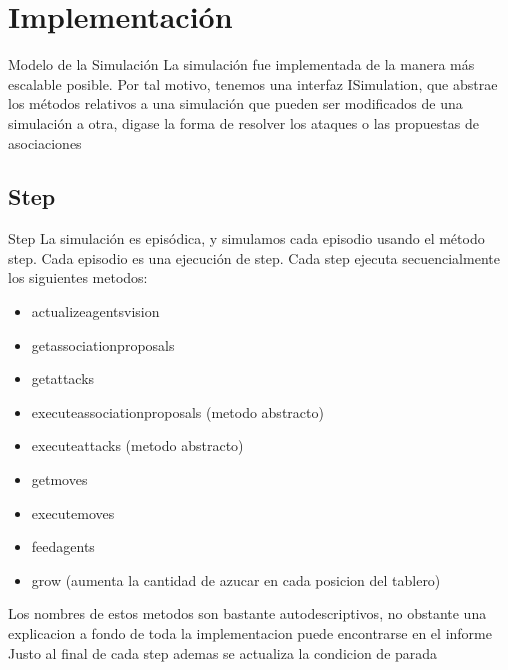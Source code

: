 \documentclass{beamer}
\begin{document}
\section{Implementación}
\begin{frame}{Modelo de la Simulación}
  La simulación fue implementada de la manera más escalable posible. Por tal motivo, tenemos una interfaz ISimulation, que abstrae los métodos relativos a una simulación que pueden ser modificados de una simulación a otra, digase la forma de resolver los ataques o las propuestas de asociaciones
\end{frame}

\subsection{Step}
\begin{frame}{Step}
  La simulación es episódica, y simulamos cada episodio usando el método step. Cada episodio es una ejecución de step. Cada step ejecuta secuencialmente los siguientes metodos:
  \begin{itemize}
    \item actualize\textunderscore agents\textunderscore vision
    \item get\textunderscore association\textunderscore proposals
    \item get\textunderscore attacks
    \item execute\textunderscore association\textunderscore proposals (metodo abstracto)
    \item execute\textunderscore attacks (metodo abstracto)
    \item get\textunderscore moves
    \item execute\textunderscore moves
    \item feed\textunderscore agents
    \item grow (aumenta la cantidad de azucar en cada posicion del tablero)
  \end{itemize}
  Los nombres de estos metodos son bastante autodescriptivos, no obstante una explicacion a fondo de toda la implementacion puede encontrarse en el informe
  Justo al final de cada step ademas se actualiza la condicion de parada
\end{frame}
\end{document}
